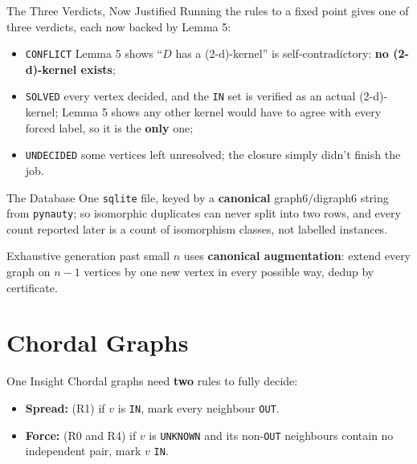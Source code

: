\documentclass[11pt]{beamer}
\begin{document}
\begin{frame}{The Three Verdicts, Now Justified}
  Running the rules to a fixed point gives one of three verdicts, each now
  backed by Lemma 5:

  \begin{itemize}
    \item \texttt{CONFLICT} Lemma 5 shows ``$D$ has a (2-d)-kernel'' is
          self-contradictory: \textbf{no (2-d)-kernel exists};
    \item \texttt{SOLVED} every vertex decided, and the \texttt{IN} set is
          verified as an actual (2-d)-kernel; Lemma 5 shows any other kernel
          would have to agree with every forced label, so it is the
          \textbf{only} one;
    \item \texttt{UNDECIDED} some vertices left unresolved; the closure
          simply didn't finish the job.
  \end{itemize}
\end{frame}

\begin{frame}{The Database}
  One \texttt{sqlite} file, keyed by a \textbf{canonical} graph6/digraph6
  string from \texttt{pynauty}; so isomorphic duplicates can never split
  into two rows, and every count reported later is a count of isomorphism
  classes, not labelled instances.

  \smallskip
  Exhaustive generation past small $n$ uses \textbf{canonical augmentation}:
  extend every graph on $n{-}1$ vertices by one new vertex in every possible
  way, dedup by certificate.
\end{frame}

\section{Chordal Graphs}

\begin{frame}{One Insight}
  Chordal graphs need \textbf{two} rules to fully decide:

  \begin{itemize}
    \item \textbf{Spread:} (R1) if $v$ is \texttt{IN}, mark every neighbour
          \texttt{OUT}.
    \item \textbf{Force:} (R0 and R4) if $v$ is
          \texttt{UNKNOWN} and its non-\texttt{OUT} neighbours contain no
          independent pair, mark $v$ \texttt{IN}.
  \end{itemize}
\end{frame}
\end{document}
